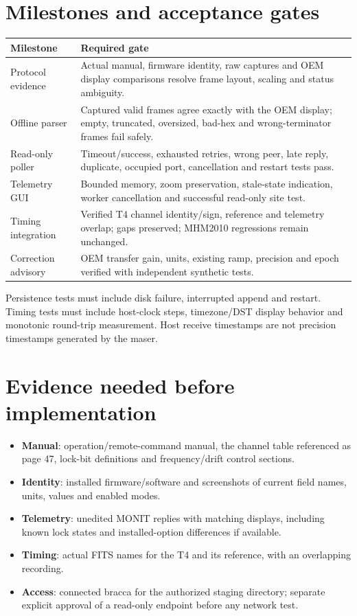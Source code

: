 \documentclass[11pt,a4paper]{article}
\begin{document}
\section{Milestones and acceptance gates}
\begin{longtable}{@{}p{.25\linewidth}p{.69\linewidth}@{}}
\toprule
Milestone & Required gate\\
\midrule
Protocol evidence & Actual manual, firmware identity, raw captures and OEM
display comparisons resolve frame layout, scaling and status ambiguity.\\
Offline parser & Captured valid frames agree exactly with the OEM display;
empty, truncated, oversized, bad-hex and wrong-terminator frames fail safely.\\
Read-only poller & Timeout/success, exhausted retries, wrong peer, late reply,
duplicate, occupied port, cancellation and restart tests pass.\\
Telemetry GUI & Bounded memory, zoom preservation, stale-state indication,
worker cancellation and successful read-only site test.\\
Timing integration & Verified T4 channel identity/sign, reference and telemetry
overlap; gaps preserved; MHM2010 regressions remain unchanged.\\
Correction advisory & OEM transfer gain, units, existing ramp, precision and
epoch verified with independent synthetic tests.\\
\bottomrule
\end{longtable}

Persistence tests must include disk failure, interrupted append and restart.
Timing tests must include host-clock steps, timezone/DST display behavior and
monotonic round-trip measurement. Host receive timestamps are not precision
timestamps generated by the maser.
\clearpage

\section{Evidence needed before implementation}
\begin{itemize}
\item \textbf{Manual}: operation/remote-command manual, the channel table
referenced as page 47, lock-bit definitions and frequency/drift control sections.
\item \textbf{Identity}: installed firmware/software and screenshots of current
field names, units, values and enabled modes.
\item \textbf{Telemetry}: unedited MONIT replies with matching displays,
including known lock states and installed-option differences if available.
\item \textbf{Timing}: actual FITS names for the T4 and its reference, with an
overlapping recording.
\item \textbf{Access}: connected bracca for the authorized staging directory;
separate explicit approval of a read-only endpoint before any network test.
\end{itemize}
\end{document}

